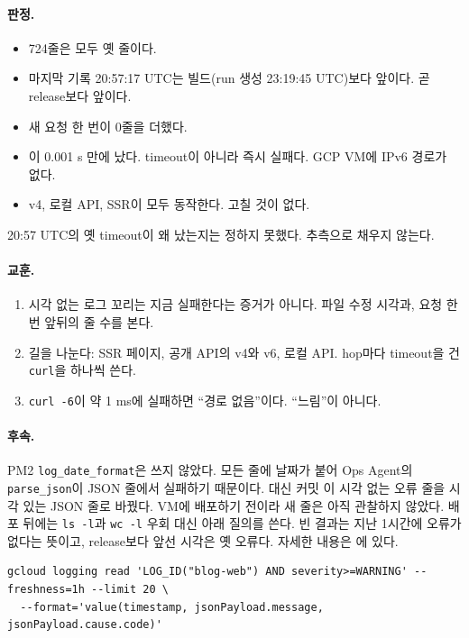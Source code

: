 \paragraph{판정.}
\begin{itemize}[nosep]
  \item 724줄은 모두 옛 줄이다.
  \item 마지막 기록 20:57:17 UTC는  빌드(run 생성 23:19:45 UTC)보다 앞이다. 곧 release보다 앞이다.
  \item 새 요청 한 번이 0줄을 더했다.
  \item {}이 0.001 s 만에 났다. timeout이 아니라 즉시 실패다. GCP VM에 IPv6 경로가 없다.
  \item v4, 로컬 API, SSR이 모두 동작한다. 고칠 것이 없다.
\end{itemize}

\begin{callout}[모르는 것]
20:57 UTC의 옛 timeout이 왜 났는지는 정하지 못했다.
추측으로 채우지 않는다.
\end{callout}

\paragraph{교훈.}
\begin{enumerate}[nosep]
  \item 시각 없는 로그 꼬리는 지금 실패한다는 증거가 아니다. 파일 수정 시각과, 요청 한 번 앞뒤의 줄 수를 본다.
  \item 길을 나눈다: SSR 페이지, 공개 API의 v4와 v6, 로컬 API. hop마다 timeout을 건 \texttt{curl}을 하나씩 쓴다.
  \item \texttt{curl -6}이 약 1 ms에 실패하면 ``경로 없음''이다. ``느림''이 아니다.
\end{enumerate}

\paragraph{후속.}
PM2 \texttt{log\_date\_format}은 쓰지 않았다.
모든 줄에 날짜가 붙어 Ops Agent의 \texttt{parse\_json}이 JSON 줄에서 실패하기 때문이다.
대신 커밋 이 시각 없는 오류 줄을 시각 있는 JSON 줄로 바꿨다.
VM에 배포하기 전이라 새 줄은 아직 관찰하지 않았다.
배포 뒤에는 \texttt{ls -l}과 \texttt{wc -l} 우회 대신 아래 질의를 쓴다.
빈 결과는 지난 1시간에 오류가 없다는 뜻이고, release보다 앞선 시각은 옛 오류다.
자세한 내용은 에 있다.

\begin{lstlisting}[language={}]
gcloud logging read 'LOG_ID("blog-web") AND severity>=WARNING' --freshness=1h --limit 20 \
  --format='value(timestamp, jsonPayload.message, jsonPayload.cause.code)'
\end{lstlisting}
